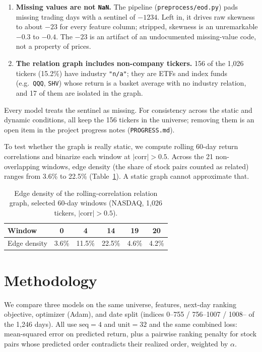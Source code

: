 \documentclass[12pt]{article}
\begin{document}
\begin{enumerate}
  \item \textbf{Missing values are not \texttt{NaN}.} The pipeline (\texttt{preprocess/eod.py})
  pads missing trading days with a sentinel of $-1234$. Left in, it drives raw skewness to about
  $-23$ for every feature column; stripped, skewness is an unremarkable $-0.3$ to $-0.4$. The
  $-23$ is an artifact of an undocumented missing-value code, not a property of prices.
  \item \textbf{The relation graph includes non-company tickers.} 156 of the 1{,}026 tickers
  (15.2\%) have industry \texttt{"n/a"}; they are ETFs and index funds (e.g.\ \texttt{QQQ},
  \texttt{SHV}) whose return is a basket average with no industry relation, and 17 of them are
  isolated in the graph.
\end{enumerate}

Every model treats the sentinel as missing. For consistency across the static and dynamic
conditions, all keep the 156 tickers in the universe; removing them is an open item in the project
progress notes (\texttt{PROGRESS.md}).

To test whether the graph is really static, we compute rolling 60-day return correlations and
binarize each window at $|\text{corr}|>0.5$. Across the 21 non-overlapping windows, edge density
(the share of stock pairs counted as related) ranges from 3.6\% to 22.5\% (Table~\ref{tab:density}).
A static graph cannot approximate that.

\begin{table}[h]
\centering
\caption{Edge density of the rolling-correlation relation graph, selected 60-day windows
(NASDAQ, 1{,}026 tickers, $|\text{corr}|>0.5$).}
\label{tab:density}
\begin{tabular}{lccccc}
\toprule
Window & 0 & 4 & 14 & 19 & 20 \\
\midrule
Edge density & 3.6\% & 11.5\% & 22.5\% & 4.6\% & 4.2\% \\
\bottomrule
\end{tabular}
\end{table}


\section{Methodology}
\label{sec:methods}

We compare three models on the same universe, features, next-day ranking objective, optimizer
(Adam), and date split (indices 0--755 / 756--1007 / 1008-- of the 1{,}246 days). All use
$\text{seq}=4$ and $\text{unit}=32$ and the same combined loss: mean-squared error on predicted
return, plus a pairwise ranking penalty for stock pairs whose predicted order contradicts their
realized order, weighted by $\alpha$.
\end{document}
